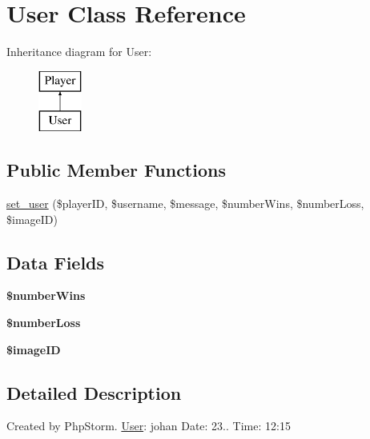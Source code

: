 \hypertarget{class_user}{}\section{User Class Reference}
\label{class_user}
Inheritance diagram for User\+:\begin{figure}[H]
\begin{center}
\leavevmode
\includegraphics[height=2.000000cm]{class_user}
\end{center}
\end{figure}
\subsection*{Public Member Functions}
\begin{DoxyCompactItemize}
\item 
\hyperlink{class_user_a8cefa83861ded23e81667e5ba3a98702}{set\+\_\+user} (\$player\+ID, \$username, \$message, \$number\+Wins, \$number\+Loss, \$image\+ID)
\end{DoxyCompactItemize}
\subsection*{Data Fields}
\begin{DoxyCompactItemize}
\item 
\mbox{\label{class_user_a4a9417bc21ce9ff476de702c9b007326}} 
{\bfseries \$number\+Wins}
\item 
\mbox{\label{class_user_a6c280f09f0d796423df08262a813a632}} 
{\bfseries \$number\+Loss}
\item 
\mbox{\label{class_user_a083e40d42ed789f034faea0f132b86fb}} 
{\bfseries \$image\+ID}
\end{DoxyCompactItemize}


\subsection{Detailed Description}
Created by Php\+Storm. \hyperlink{class_user}{User}\+: johan Date\+: 23.. Time\+: 12\+:15 

